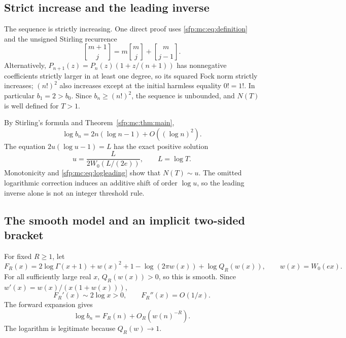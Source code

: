 \documentclass[11pt,letterpaper]{article}
\numberwithin{equation}{section}
\theoremstyle{definition}\newtheorem{definition}[theorem]{Definition}
\theoremstyle{remark}\newtheorem{remark}[theorem]{Remark}
\newcommand{\sone}[2]{\genfrac{[}{]}{0pt}{}{#1}{#2}}
\newcommand{\stir}{\sone}
\begin{document}
\subsection{Strict increase and the leading inverse}
The sequence is strictly increasing. One direct proof uses
\eqref{sfp:mc:eq:definition} and the unsigned Stirling recurrence
\begin{equation}\label{sfp:mc:eq:stirlingrec}
 \stir{m+1}{j}=m\stir mj+\stir m{j-1}.
\end{equation}
Alternatively, $P_{n+1}(z)=P_n(z)(1+z/(n+1))$ has nonnegative
coefficients strictly larger in at least one degree, so its squared
Fock norm strictly increases; $(n!)^2$ also increases except at
the initial harmless equality $0!=1!$. In particular $b_1=2>b_0$.
Since $b_n\geq(n!)^2$, the sequence is unbounded, and $N(T)$ is
well defined for $T>1$.

By Stirling's formula and Theorem~\ref{sfp:mc:thm:main},
\begin{equation}\label{sfp:mc:eq:logleading}
 \log b_n=2n(\log n-1)+O((\log n)^2).
\end{equation}
The equation $2u(\log u-1)=L$ has the exact positive solution
\begin{equation}\label{sfp:mc:eq:leadinginverse}
 u=\frac{L}{2W_0(L/(2e))},\qquad L=\log T.
\end{equation}
Monotonicity and \eqref{sfp:mc:eq:logleading} show that $N(T)\sim u$.
The omitted logarithmic correction induces an additive shift
of order $\log u$, so the leading inverse alone is not an
integer threshold rule.

\subsection{The smooth model and an implicit two-sided bracket}
For fixed $R\geq1$, let
\begin{equation}\label{sfp:mc:eq:FR}
 F_R(x)=2\log\Gamma(x+1)+w(x)^2+1-\log(2\pi w(x))
                       +\log Q_R(w(x)),
 \qquad w(x)=W_0(ex).
\end{equation}
For all sufficiently large real $x$, $Q_R(w(x))>0$, so this is
smooth. Since $w'(x)=w(x)/(x(1+w(x)))$,
\begin{equation}\label{sfp:mc:eq:FRderivatives}
 F_R'(x)\sim2\log x>0,\qquad F_R''(x)=O(1/x).
\end{equation}
The forward expansion gives
\begin{equation}\label{sfp:mc:eq:logmodelerror}
 \log b_n=F_R(n)+O_R(w(n)^{-R}).
\end{equation}
The logarithm is legitimate because $Q_R(w)\to1$.
\end{document}
